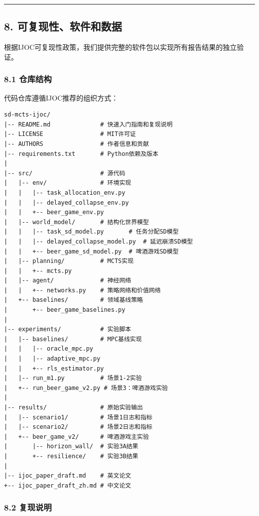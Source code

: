 \documentclass[UTF8]{ctexart}
\begin{document}
\begin{center}\rule{0.5\linewidth}{0.4pt}\end{center}

\hypertarget{ux53efux6269ux5c55ux6027ux8f6fux4ef6ux548cux6570ux636e}{%
\subsection{8.
可复现性、软件和数据}\label{ux53efux6269ux5c55ux6027ux8f6fux4ef6ux548cux6570ux636e}}

根据IJOC可复现性政策，我们提供完整的软件包以实现所有报告结果的独立验证。

\hypertarget{ux4ed3ux5e93ux7ed3ux6784}{%
\subsubsection{8.1 仓库结构}\label{ux4ed3ux5e93ux7ed3ux6784}}

代码仓库遵循IJOC推荐的组织方式：

\begin{verbatim}
sd-mcts-ijoc/
|-- README.md              # 快速入门指南和复现说明
|-- LICENSE                # MIT许可证
|-- AUTHORS                # 作者信息和贡献
|-- requirements.txt       # Python依赖及版本
|
|-- src/                   # 源代码
|   |-- env/               # 环境实现
|   |   |-- task_allocation_env.py
|   |   |-- delayed_collapse_env.py
|   |   +-- beer_game_env.py
|   |-- world_model/       # 结构化世界模型
|   |   |-- task_sd_model.py       # 任务分配SD模型
|   |   |-- delayed_collapse_model.py  # 延迟崩溃SD模型
|   |   +-- beer_game_sd_model.py  # 啤酒游戏SD模型
|   |-- planning/          # MCTS实现
|   |   +-- mcts.py
|   |-- agent/             # 神经网络
|   |   +-- networks.py    # 策略网络和价值网络
|   +-- baselines/         # 领域基线策略
|       +-- beer_game_baselines.py
|
|-- experiments/           # 实验脚本
|   |-- baselines/         # MPC基线实现
|   |   |-- oracle_mpc.py
|   |   |-- adaptive_mpc.py
|   |   +-- rls_estimator.py
|   |-- run_m1.py          # 场景1-2实验
|   +-- run_beer_game_v2.py # 场景3：啤酒游戏实验
|
|-- results/               # 原始实验输出
|   |-- scenario1/         # 场景1日志和指标
|   |-- scenario2/         # 场景2日志和指标
|   +-- beer_game_v2/      # 啤酒游戏主实验
|       |-- horizon_wall/  # 实验3A结果
|       +-- resilience/    # 实验3B结果
|
|-- ijoc_paper_draft.md    # 英文论文
+-- ijoc_paper_draft_zh.md # 中文论文
\end{verbatim}

\hypertarget{ux590dux73b0ux8bf4ux660e}{%
\subsubsection{8.2 复现说明}\label{ux590dux73b0ux8bf4ux660e}}
\end{document}
